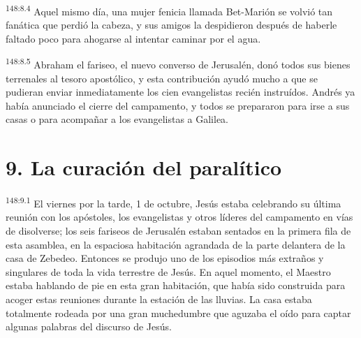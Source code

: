 \par 
\textsuperscript{148:8.4} Aquel mismo día, una mujer fenicia llamada Bet-Marión se volvió tan fanática que perdió la cabeza, y sus amigos la despidieron después de haberle faltado poco para ahogarse al intentar caminar por el agua.

\par 
\textsuperscript{148:8.5} Abraham el fariseo, el nuevo converso de Jerusalén, donó todos sus bienes terrenales al tesoro apostólico, y esta contribución ayudó mucho a que se pudieran enviar inmediatamente los cien evangelistas recién instruídos. Andrés ya había anunciado el cierre del campamento, y todos se prepararon para irse a sus casas o para acompañar a los evangelistas a Galilea.

\section*{9. La curación del paralítico}
\par 
\textsuperscript{148:9.1} El viernes por la tarde, 1 de octubre, Jesús estaba celebrando su última reunión con los apóstoles, los evangelistas y otros líderes del campamento en vías de disolverse; los seis fariseos de Jerusalén estaban sentados en la primera fila de esta asamblea, en la espaciosa habitación agrandada de la parte delantera de la casa de Zebedeo. Entonces se produjo uno de los episodios más extraños y singulares de toda la vida terrestre de Jesús. En aquel momento, el Maestro estaba hablando de pie en esta gran habitación, que había sido construida para acoger estas reuniones durante la estación de las lluvias. La casa estaba totalmente rodeada por una gran muchedumbre que aguzaba el oído para captar algunas palabras del discurso de Jesús.

